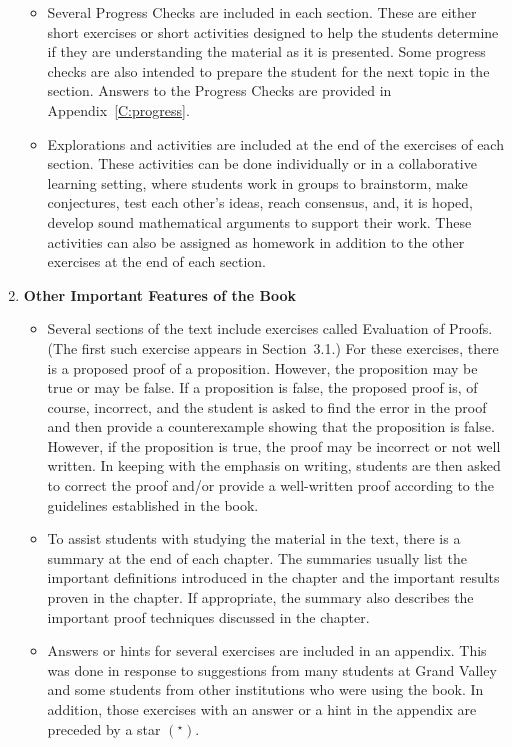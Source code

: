 \begin{enumerate}
\begin{itemize}
\item Several Progress Checks are included in each section.  These are either short exercises or short activities designed to help the students determine if they are understanding the material as it is presented.  Some progress checks are also intended to prepare the student for the next topic in the section.  Answers to the Progress Checks are provided in Appendix~\ref{C:progress}.

\item Explorations and activities are included at the end of the exercises of each section.  These activities can be done individually or in a collaborative learning setting, where students work in groups to brainstorm, make conjectures, test each other's ideas, reach consensus, and, it is hoped, develop sound mathematical arguments to support their work.  These activities can also be assigned as homework in addition to the other exercises at the end of each section.
\end{itemize}


\item \textbf{Other Important Features of the Book}
\begin{itemize}
\item Several sections of the text include exercises called Evaluation of Proofs.  (The first such exercise appears in Section~3.1.)  For these exercises, there is a proposed proof of a proposition.  However, the proposition may be true or may be false.  If a proposition is false, the proposed proof is, of course, incorrect, and the student is asked to find the error in the proof and then provide a counterexample showing that the proposition is false.  However, if the proposition is true, the proof may be incorrect or not well written.  In keeping with the emphasis on writing, students are then asked to correct the proof and/or provide a well-written proof according to the guidelines established in the book.

\item To assist students with studying the material in the text, there is a summary at the end of each chapter.  The summaries usually list the important definitions introduced in the chapter and the important results proven in the chapter.  If appropriate, the summary also describes the important proof techniques discussed in the chapter.

\item Answers or hints for several exercises are included in an appendix.  This was done in response to suggestions from many students at Grand Valley and some students from other institutions who were using the book.  In addition, those exercises with an answer or a hint in the appendix are preceded by a star 
$\left( ^\star \right)$.
\end{itemize}



\end{enumerate}
